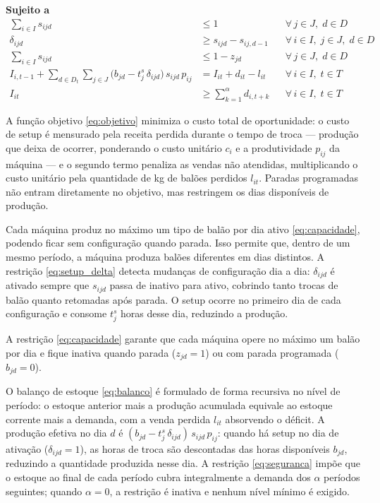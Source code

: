 \documentclass[fleqn,12pt,a4paper]{article}
\begin{document}
\noindent\textbf{Sujeito a}
\begin{align}
\sum_{i \in I} s_{ijd} &\le 1
    && \forall\, j \in J,\; d \in D \label{eq:estado_unico} \\
\delta_{ijd} &\ge s_{ijd} - s_{ij,d-1}
    && \forall\, i \in I,\; j \in J,\; d \in D \label{eq:setup_delta} \\
\sum_{i \in I} s_{ijd}
    &\le 1 - z_{jd}
    && \forall\, j \in J,\; d \in D \label{eq:capacidade} \\
I_{i,t-1} + \sum_{d \in D_t}\sum_{j \in J} \bigl(b_{jd} - t^s_{j}\,\delta_{ijd}\bigr)\, s_{ijd}\, p_{ij}
    &= I_{it} + d_{it} - l_{it}
    && \forall\, i \in I,\; t \in T \label{eq:balanco} \\
I_{it} &\ge \sum_{k=1}^{\alpha} d_{i,t+k}
    && \forall\, i \in I,\; t \in T \label{eq:seguranca}
\end{align}

A função objetivo \eqref{eq:objetivo} minimiza o custo total de oportunidade: o custo de setup é mensurado pela receita perdida durante o tempo de troca --- produção que deixa de ocorrer, ponderando o custo unitário $c_i$ e a produtividade $p_{ij}$ da máquina --- e o segundo termo penaliza as vendas não atendidas, multiplicando o custo unitário pela quantidade de kg de balões perdidos $l_{it}$. Paradas programadas não entram diretamente no objetivo, mas restringem os dias disponíveis de produção.

Cada máquina produz no máximo um tipo de balão por dia ativo \eqref{eq:capacidade}, podendo ficar sem configuração quando parada. Isso permite que, dentro de um mesmo período, a máquina produza balões diferentes em dias distintos. A restrição \eqref{eq:setup_delta} detecta mudanças de configuração dia a dia: $\delta_{ijd}$ é ativado sempre que $s_{ijd}$ passa de inativo para ativo, cobrindo tanto trocas de balão quanto retomadas após parada. O setup ocorre no primeiro dia de cada configuração e consome $t^s_j$ horas desse dia, reduzindo a produção.

A restrição \eqref{eq:capacidade} garante que cada máquina opere no máximo um balão por dia e fique inativa quando parada ($z_{jd} = 1$) ou com parada programada ($b_{jd} = 0$).

O balanço de estoque \eqref{eq:balanco} é formulado de forma recursiva no nível de período: o estoque anterior mais a produção acumulada equivale ao estoque corrente mais a demanda, com a venda perdida $l_{it}$ absorvendo o déficit. A produção efetiva no dia $d$ é $(b_{jd} - t^s_j\,\delta_{ijd})\,s_{ijd}\,p_{ij}$: quando há setup no dia de ativação ($\delta_{ijd}=1$), as horas de troca são descontadas das horas disponíveis $b_{jd}$, reduzindo a quantidade produzida nesse dia. A restrição \eqref{eq:seguranca} impõe que o estoque ao final de cada período cubra integralmente a demanda dos $\alpha$ períodos seguintes; quando $\alpha = 0$, a restrição é inativa e nenhum nível mínimo é exigido.
\end{document}
